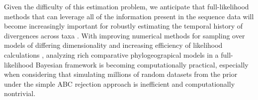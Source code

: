 Given the difficulty of this estimation problem, we anticipate that
full-likelihood methods that can leverage all of the information present in the
sequence data will become increasingly important for robustly estimating the
temporal history of divergences across taxa \citep{JeetDiss}.
With improving numerical methods for sampling over models of differing
dimensionality \citep{Green1995,Lemey2009} and increasing efficiency of
likelihood calculations \citep{Ayres2012}, analyzing rich comparative
phylogeograpical models in a full-likelihood Bayesian framework is becoming
computationally practical, especially when considering that simulating millions
of random datasets from the prior under the simple ABC rejection approach is
inefficient and computationally nontrivial.

